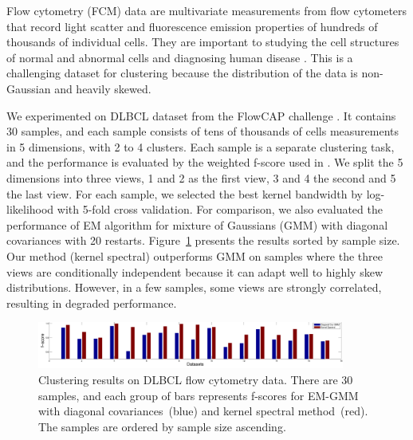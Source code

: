 
Flow cytometry (FCM) data are multivariate measurements from flow cytometers that record light scatter and fluorescence emission properties of hundreds of thousands of individual cells. They are important to studying the cell structures of normal and abnormal cells and diagnosing human disease \cite{cytometry_nature}. This is a challenging dataset for clustering because the distribution of the data is non-Gaussian and heavily skewed.

We experimented on DLBCL dataset from the FlowCAP challenge \cite{cytometry_nature}. It contains 30 samples, and each sample consists of tens of thousands of cells measurements in 5 dimensions, with 2 to 4 clusters. Each sample is a separate clustering task, and the performance is evaluated by the weighted f-score used in \cite{cytometry_nature}. We split the 5 dimensions into three views, 1 and 2 as the first view, 3 and 4 the second and 5 the last view. For each sample, we selected the best kernel bandwidth by log-likelihood with 5-fold cross validation. For comparison, we also evaluated the performance of EM algorithm for mixture of Gaussians (GMM) with diagonal covariances with 20 restarts. Figure~\ref{fig:real_data} presents the results sorted by sample size. Our method (kernel spectral) outperforms GMM on samples where the three views are conditionally independent because it can adapt well to highly skew distributions. However, in a few samples, some views are strongly correlated, resulting in degraded performance. 


\begin{figure}
  \centering
  \includegraphics[width=0.9\textwidth]{../experiment/figure/paired_bar_chat_better} 
   \vspace{-3mm}
  \caption{Clustering results on DLBCL flow cytometry data. There are 30 samples, and each group of bars represents f-scores for EM-GMM with diagonal covariances~(blue) and kernel spectral method~(red). The samples are ordered by sample size ascending.}\label{fig:real_data}
  \vspace{-3mm}
\end{figure}
